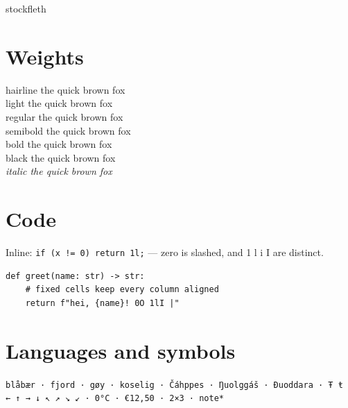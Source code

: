 \documentclass[11pt]{article}
\begin{document}
{\stockflethultra\fontsize{40}{44}\selectfont stockfleth}

\medskip
{}

\section*{Weights}
{\ttfamily
{}\selectfont hairline the quick brown fox\\
\selectfont light the quick brown fox\\
\selectfont regular the quick brown fox\\
\selectfont semibold the quick brown fox\\
\selectfont bold the quick brown fox\\
\selectfont black the quick brown fox\\
\itshape italic the quick brown fox\par}

\section*{Code}
Inline: \texttt{if (x != 0) return 1l;} — zero is slashed, and 1 l i I are distinct.

\begin{Verbatim}[fontsize=\small]
def greet(name: str) -> str:
    # fixed cells keep every column aligned
    return f"hei, {name}! 0O 1lI |"
\end{Verbatim}

\section*{Languages and symbols}
\texttt{blåbær · fjord · gøy · koselig · Čáhppes · Ŋuolggáš · Đuoddara · Ŧ ŧ}\\
\texttt{← ↑ → ↓ ↖ ↗ ↘ ↙ · 0°C · €12,50 · 2×3 · note*}
\end{document}
